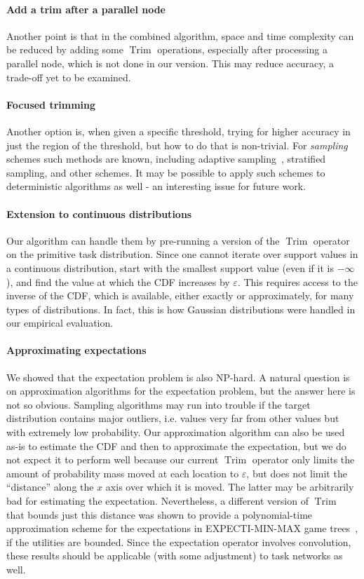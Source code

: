 \documentclass[review]{elsarticle}
\DeclareMathOperator{\Trim}{Trim}
\begin{document}
\paragraph{Add a trim after a parallel node} Another point is that in the combined algorithm,  space and time complexity can be reduced by adding some $\Trim$ operations,
especially after processing a parallel node, which is not done in our version. This may reduce accuracy,  a trade-off yet to be examined.

\paragraph{Focused trimming} Another option is, when given a specific threshold, trying for higher accuracy in just the region of the threshold, but how to do that is non-trivial. For {\em sampling} schemes such methods are known, including adaptive sampling~\cite{bucher1988adaptive,lipton1990practical}, stratified sampling, and other schemes. It may be possible to apply such schemes to deterministic algorithms as well - an interesting issue for future work. 

\paragraph{Extension to continuous distributions} Our algorithm can handle them by
pre-running a version of the $\Trim$ operator on the primitive task distribution. Since one cannot iterate over support values
in a continuous distribution, start with the smallest support value (even if it is $- \infty$), and find the value at which the CDF
increases by $\varepsilon$. This requires access to the inverse of the CDF, which is available, either exactly or approximately,
for many types of distributions. In fact, this is how Gaussian distributions were handled in our
empirical evaluation.

\paragraph{Approximating expectations} We showed that the expectation problem is also NP-hard. A natural question is on approximation algorithms for the expectation problem, but the answer here is not so obvious. Sampling algorithms may run into trouble if the target distribution contains major outliers, i.e. values very far from other values but with extremely low probability. Our approximation algorithm can also be used as-is to estimate the CDF and then to approximate the expectation, but we do not expect it to perform well because our current $\Trim$ operator only limits the amount of probability mass moved at each location to $\varepsilon$, but does not limit the ``distance'' along the $x$ axis over which it is moved. The latter may be arbitrarily bad for estimating the expectation. Nevertheless, a different version of $\Trim$ that bounds just this distance was shown to provide a polynomial-time approximation scheme for the expectations in EXPECTI-MIN-MAX game trees~\cite{shperbergmonte},  if the utilities are bounded. Since the expectation operator involves convolution, these results should be applicable (with some adjustment) to task networks as well.
\end{document}

